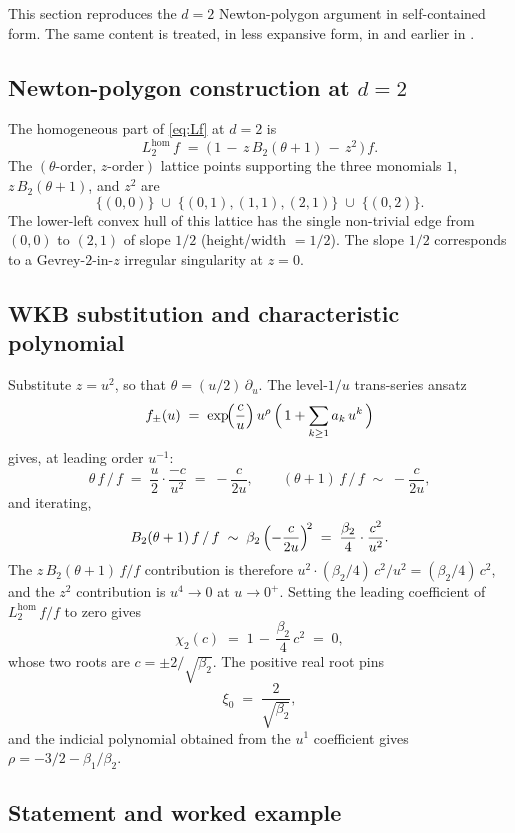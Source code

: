 \documentclass[11pt,reqno]{amsart}
\theoremstyle{plain}
\theoremstyle{definition}
\theoremstyle{remark}
\begin{document}
This section reproduces the $d = 2$ Newton-polygon argument
in self-contained form. The same content is treated, in less
expansive form, in
\cite[Proposition~3.3.A and Worked Example
\S3.3]{siarc_channel_theory_v13} and earlier in
\cite[Theorem~5, \S5]{siarc_pcf1_v13}.

\subsection{Newton-polygon construction at \texorpdfstring{$d=2$}{d=2}}
\label{ssec:d2-newton}

The homogeneous part of \eqref{eq:Lf} at $d = 2$ is
\[
  L_2^{\mathrm{hom}}\,f \;=\;
   \bigl(\,1 \,-\, z\,B_2(\theta+1) \,-\, z^2\,\bigr)\,f.
\]
The $(\theta\text{-order},\, z\text{-order})$ lattice points
supporting the three monomials $1$, $z\,B_2(\theta+1)$, and
$z^2$ are
\[
  \{(0,0)\}\;\cup\;\{(0,1),(1,1),(2,1)\}\;\cup\;\{(0,2)\}.
\]
The lower-left convex hull of this lattice has the single
non-trivial edge from $(0,0)$ to $(2,1)$ of slope
$1/2$ (height/width $=1/2$). The slope $1/2$ corresponds to
a Gevrey-$2$-in-$z$ irregular singularity at $z = 0$.

\subsection{WKB substitution and characteristic polynomial}
\label{ssec:d2-wkb}

Substitute $z = u^2$, so that $\theta = (u/2)\,\partial_u$.
The level-$1/u$ trans-series ansatz
\[
  f_\pm(u) \;=\; \exp\!\Bigl(\frac{c}{u}\Bigr)\,u^{\rho}\,
  \Bigl(\,1 + \sum_{k\ge 1} a_k\,u^k\,\Bigr)
\]
gives, at leading order $u^{-1}$:
\[
  \theta\,f \,/\, f \;=\;
  \frac{u}{2}\cdot\frac{-c}{u^2}\;=\;-\frac{c}{2u},
  \qquad
  (\theta+1)\,f \,/\, f \;\sim\; -\frac{c}{2u},
\]
and iterating,
\[
  B_2(\theta+1)\,f \,/\, f \;\sim\;
  \beta_2\,\Bigl(-\frac{c}{2u}\Bigr)^{\!2}
  \;=\; \frac{\beta_2}{4}\cdot\frac{c^2}{u^2}.
\]
The $z\,B_2(\theta+1)\,f / f$ contribution is therefore
$u^2 \cdot (\beta_2/4)\,c^2 / u^2 = (\beta_2/4)\,c^2$, and
the $z^2$ contribution is $u^4 \to 0$ at $u \to 0^+$.
Setting the leading coefficient of
$L_2^{\mathrm{hom}}\,f / f$ to zero gives
\[
  \chi_2(c) \;=\; 1 \,-\, \frac{\beta_2}{4}\,c^2 \;=\; 0,
\]
whose two roots are $c = \pm 2/\sqrt{\beta_2}$. The positive
real root pins
\[
  \xi_0 \;=\; \frac{2}{\sqrt{\beta_2}},
\]
and the indicial polynomial obtained from the $u^1$
coefficient gives $\rho = -3/2 - \beta_1/\beta_2$.

\subsection{Statement and worked example}
\label{ssec:d2-statement}
\end{document}
